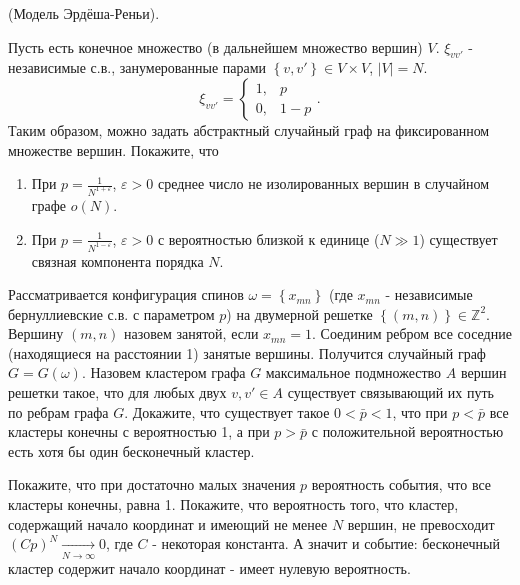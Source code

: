 \begin{problem}

(Модель Эрдёша-Реньи).

 Пусть есть конечное множество (в дальнейшем множество вершин) $V$. $\xi _{vv'} $ - независимые с.в., занумерованные парами $\left\{v,v'\right\}\in V\times V$, $\vert V \vert = N$.
\[\xi _{vv'} =\left\{\begin{array}{cc} {1,} & {p} \\ {0,} & {1-p} \end{array}\right. .\] 
Таким образом, можно задать абстрактный случайный граф на фиксированном множестве вершин. Покажите, что 

\begin{enumerate}
\item  При $p=\frac{1}{N^{1+\varepsilon } } $, $\varepsilon >0$ среднее число не изолированных вершин в случайном графе $o\left(N\right)$.

\item  При $p=\frac{1}{N^{1-\varepsilon } } $, $\varepsilon >0$ с вероятностью близкой к единице ($N \gg 1$) существует связная компонента порядка $N$.
\end{enumerate}



\end{problem}

\begin{problem} 
Рассматривается конфигурация спинов $\omega =\left\{x_{mn} \right\}$ (где $x_{mn} $ - независимые бернуллиевские с.в. с параметром $p$) на двумерной решетке $\left\{(m,n)\right\}\in {\mathbb Z}^{2} $. Вершину $(m,n)$ назовем занятой, если $x_{mn} =1$. Соединим ребром все соседние (находящиеся на расстоянии 1) занятые вершины. Получится случайный граф $G=G\left(\omega \right)$. Назовем кластером графа $G$ максимальное подмножество $A$ вершин решетки такое, что для любых двух $v,v'\in A$ существует связывающий их путь по ребрам графа $G$. Докажите, что существует такое $0<\bar{p}<1$, что при $p<\bar{p}$ все кластеры конечны с вероятностью 1, а при $p>\bar{p}$ с положительной вероятностью есть хотя бы один бесконечный кластер.


\begin{ordre}
Покажите, что при достаточно малых значения $p$ вероятность события, что все кластеры конечны, равна 1. Покажите, что вероятность того, что кластер, содержащий начало координат и имеющий не менее $N$ вершин, не превосходит $\left(Cp\right)^{N} \mathop{\to }\limits_{N\to \infty } 0$, где $C$ - некоторая константа. А значит и событие: бесконечный кластер содержит начало координат - имеет нулевую вероятность.
\end{ordre}

\end{problem}

